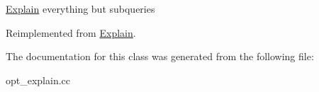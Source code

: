 \mbox{\hyperlink{classExplain}{Explain}} everything but subqueries 

Reimplemented from \mbox{\hyperlink{classExplain_a2b5b074864b25d4bb669047dbcae8abb}{Explain}}.



The documentation for this class was generated from the following file\+:\begin{DoxyCompactItemize}
\item 
opt\+\_\+explain.\+cc\end{DoxyCompactItemize}
